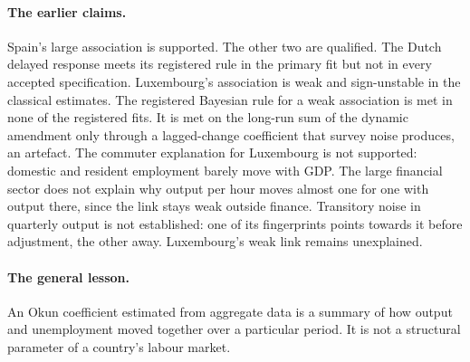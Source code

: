 \paragraph{The earlier claims.} Spain's large association is supported. The other two are
qualified. The Dutch delayed response meets its registered rule in the primary fit but not
in every accepted specification. Luxembourg's association is weak and sign-unstable in the
classical estimates. The registered Bayesian rule for a weak association is met in none of
the registered fits. It is met on the long-run sum of the dynamic amendment only through
a lagged-change coefficient that survey noise produces, an artefact. The commuter
explanation for Luxembourg is not supported: domestic and resident employment barely move
with GDP. The large financial sector does not explain why output per hour moves almost
one for one with output there, since the link stays weak outside finance. Transitory noise
in quarterly output is not established: one of its fingerprints points towards it before
adjustment, the other away. Luxembourg's weak link remains unexplained.

\paragraph{The general lesson.} An Okun coefficient estimated from aggregate data is a
summary of how output and unemployment moved together over a particular period. It is not
a structural parameter of a country's labour market.
